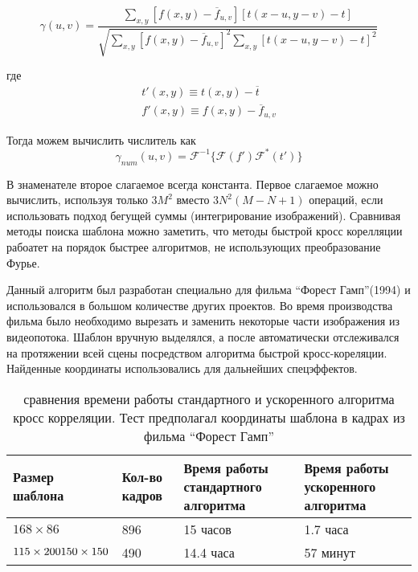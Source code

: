 \documentclass[oneside,final,14pt]{extreport}
\begin{document}
\begin{equation}
\gamma(u,v)
=
\frac{
\sum_{x,y}
[f(x,y) - \overline{f}_{u,v}]
[t(x-u,y-v)-t]
}
{
\sqrt{
\sum_{x,y}
[f(x,y) - \overline{f}_{u,v}]^2
\sum_{x,y}
[t(x-u,y-v)-t]^2
}
} 
\end{equation}

где
\begin{gather*}
t'(x,y)
\equiv
t(x,y) - \overline{t}
\\
f'(x,y)
\equiv
f(x,y) - \overline{f}_{u,v}
\end{gather*}

Тогда можем вычислить числитель как
\begin{equation}
\gamma_{num}(u,v)
=
\mathcal{F}^{-1}
\{
\mathcal{F}(f')
\mathcal{F}^*(t')
\}
\end{equation}

В знаменателе второе слагаемое всегда константа. Первое слагаемое можно вычислить, используя только $3M^2$   вместо $3N^2(M-N+1)$ операций, если использовать подход бегущей суммы (интегрирование изображений). 
Сравнивая методы поиска шаблона можно заметить, что методы быстрой кросс корелляции рабоатет на порядок быстрее алгоритмов, не использующих преобразование Фурье. 

Данный алгоритм был разработан специально для фильма “Форест Гамп”(1994) и использовался в большом количестве других проектов. Во время производства фильма было необходимо вырезать и заменить некоторые части изображения из видеопотока. Шаблон вручную выделялся, а после автоматически отслеживался на протяжении всей сцены посредством алгоритма быстрой кросс-кореляции. Найденные координаты использовались для дальнейших спецэффектов.

\begin{table}[H]
\caption{
сравнения времени работы стандартного и ускоренного алгоритма кросс корреляции. Тест предполагал координаты шаблона в кадрах из фильма “Форест Гамп”
}
\begin{tabularx}{\textwidth}{|X|X|X|X|}
\hline
Размер шаблона
&
Кол-во кадров
&
Время работы стандартного алгоритма
&
Время работы ускоренного алгоритма
\\
\hline
$168 \times 86$ & 896 & 15 часов & 1.7 часа 
\\
\hline
$	 115\times 200 \newline 150 \times 150 $
 & 490  &14.4 часа & 57 минут 
\\
\hline
\end{tabularx}
\end{table}
\end{document}
